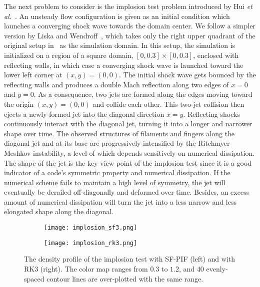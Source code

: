 \documentclass[times,preprint,3p]{elsarticle}
\begin{document}
The next problem to consider is the implosion test problem
introduced by Hui \textit{et al.}~\cite{hui1999unified}.
An unsteady flow configuration is given as an initial condition which launches
a converging shock wave towards the domain center.
We follow a simpler version by Liska and Wendroff~\cite{liska2003comparison},
which takes only the right upper quadrant
of the original setup in~\cite{hui1999unified}
as the simulation domain.
In this setup, the simulation is initialized on a region of a square domain,
\( \left[ 0, 0.3 \right] \times \left[ 0, 0.3 \right] \),
enclosed with reflecting walls,
in which case a converging shock wave is launched toward the lower left corner
at $(x,y)=(0,0)$.
The initial shock wave gets bounced by the reflecting walls and produces a double Mach
reflection along two edges of $x=0$ and $y=0$. As a consequence,
two jets are formed along the edges moving toward the origin $(x,y)=(0,0)$ and collide
each other. This two-jet collision then ejects a newly-formed jet into the diagonal direction
$x=y$. Reflecting shocks continuously interact with the diagonal jet, turning it into
a longer and narrower shape over time. The observed structures of filaments and fingers
along the diagonal jet and at its base are progressively intensified by the
Ritchmyer-Meshkov instability, a level of which depends sensitively on
numerical dissipation.
%
%
The shape of the jet is the key view point of
the implosion test since it is a good indicator of
a code's symmetric property and numerical dissipation.
If the numerical scheme fails to maintain a high level of symmetry,
the jet will eventually be derailed off-diagonally and deformed over time.
Besides, an excess amount of numerical dissipation will
turn the jet into a less narrow and less elongated shape along the diagonal.


\begin{figure}[ht!]
    \centering
    \begin{subfigure}{80mm}
        \centering
        \texttt{[image: implosion\_sf3.png]}
    \end{subfigure}
    \begin{subfigure}{80mm}
        \centering
        \texttt{[image: implosion\_rk3.png]}
    \end{subfigure}
    \caption{The density profile of the implosion test
        with SF-PIF (left) and with RK3 (right).
        The color map ranges from \( 0.3 \) to \( 1.2 \), and
        40 evenly-spaced contour lines are over-plotted with
        the same range.
    }\label{fig:implosion}
\end{figure}
\end{document}
